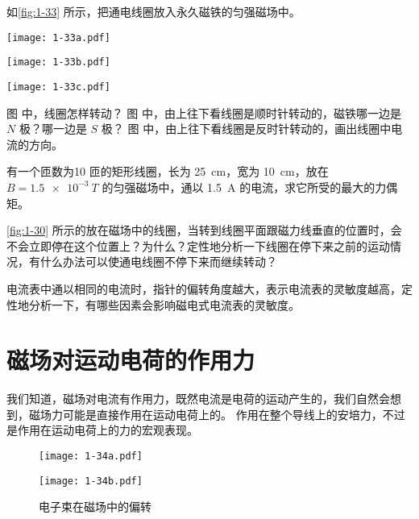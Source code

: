 \begin{Practice}
\begin{question}
  \item 如\cref{fig:1-33} 所示，把通电线圈放入永久磁铁的匀强磁场中。
  \begin{figurehere}
    \nextfloat
    \begin{minipage}{\linewidth}\centering
    \begin{minipage}{0.32\linewidth}\centering
      \texttt{[image: 1-33a.pdf]}
      \subcaption{}\label{fig:1-33a}
    \end{minipage}
    \begin{minipage}{0.32\linewidth}\centering
      \texttt{[image: 1-33b.pdf]}
      \subcaption{}\label{fig:1-33b}
    \end{minipage}
    \begin{minipage}{0.32\linewidth}\centering
      \texttt{[image: 1-33c.pdf]}
      \subcaption{}\label{fig:1-33c}
    \end{minipage}
    \caption{}\label{fig:1-33}
  \end{minipage}
  \end{figurehere}
  \begin{tasks}
    \task 图  中，线圈怎样转动？
    \task 图  中，由上往下看线圈是顺时针转动的，磁铁哪一边是 $N$ 极？哪一边是 $S$ 极？
    \task 图  中，由上往下看线圈是反时针转动的，画出线圈中电流的方向。
  \end{tasks}
  \item 有一个匝数为10 匝的矩形线圈，长为 \qty{25}{cm}，宽为 \qty{10}{cm}，放在 $B=\qty{1.5e-3}{T}$ 的匀强磁场中，通以 \qty{1.5}{A} 的电流，求它所受的最大的力偶矩。
  \item \cref{fig:1-30} 所示的放在磁场中的线圈，当转到线圈平面跟磁力线垂直的位置时，会不会立即停在这个位置上？为什么？定性地分析一下线圈在停下来之前的运动情况，有什么办法可以使通电线圈不停下来而继续转动？
  \item 电流表中通以相同的电流时，指针的偏转角度越大，表示电流表的灵敏度越高，定性地分析一下，有哪些因素会影响磁电式电流表的灵敏度。
\end{question}
\end{Practice}

\section{磁场对运动电荷的作用力}
我们知道，磁场对电流有作用力，既然电流是电荷的运动产生的，我们自然会想到，磁场力可能是直接作用在运动电荷上的。
作用在整个导线上的安培力，不过是作用在运动电荷上的力的宏观表现。
\begin{figure}
  \begin{minipage}[b]{0.45\linewidth}\centering
    \texttt{[image: 1-34a.pdf]}
    \subcaption{}\label{fig:1-34a}
  \end{minipage}
  \begin{minipage}[b]{0.45\linewidth}\centering
    \texttt{[image: 1-34b.pdf]}
    \subcaption{}\label{fig:1-34b}
  \end{minipage}
	\caption{电子束在磁场中的偏转}\label{fig:1-34}
\end{figure}

